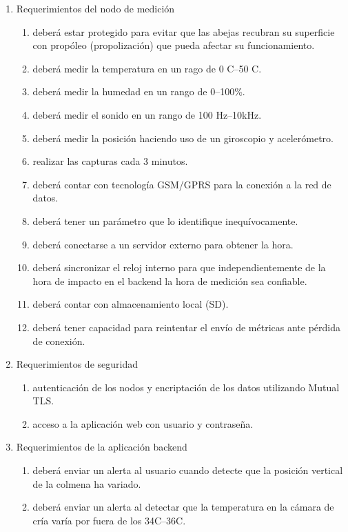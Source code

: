 \documentclass[
11pt, %
codirector, %
]{charter}
\begin{document}
\begin{enumerate}
	\item Requerimientos del nodo de medición
		\begin{enumerate}
			\item deberá estar protegido para evitar que las abejas recubran su superficie con propóleo (propolización) que pueda afectar su funcionamiento.
			\item deberá medir la temperatura en un rago de 0 \textdegree{}C--50 \textdegree{}C.
			\item deberá medir la humedad en un rango de 0--100\%.
			\item deberá medir el sonido en un rango de 100 Hz--10kHz.
			\item deberá medir la posición haciendo uso de un giroscopio y acelerómetro.
			\item realizar las capturas cada 3 minutos.
			\item deberá contar con tecnología GSM/GPRS para la conexión a la red de datos.
			\item deberá tener un parámetro que lo identifique inequívocamente.
			\item deberá conectarse a un servidor externo para obtener la hora.
			\item deberá sincronizar el reloj interno para que independientemente de la hora de impacto en el backend la hora de medición sea confiable.
			\item deberá contar con almacenamiento local (SD).
			\item deberá tener capacidad para reintentar el envío de métricas ante pérdida de conexión.
		\end{enumerate}
	\item Requerimientos de seguridad
		\begin{enumerate}
			\item autenticación de los nodos y encriptación de los datos utilizando Mutual TLS.
			\item acceso a la aplicación web con usuario y contraseña.
		\end{enumerate}
	\item Requerimientos de la aplicación backend
		\begin{enumerate}
			\item deberá enviar un alerta al usuario cuando detecte que la posición vertical de la colmena ha variado.
			\item deberá enviar un alerta al detectar que la temperatura en la cámara de cría varía por fuera de los 34\textdegree{}C--36\textdegree{}C.

\end{enumerate}
\end{enumerate}
\end{document}
